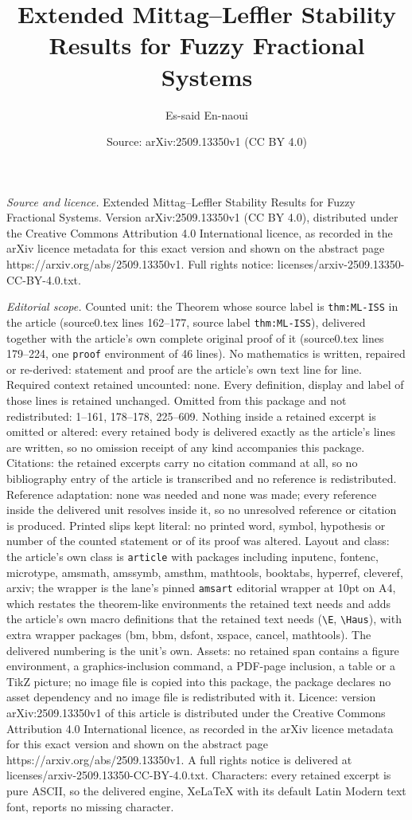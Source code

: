 \documentclass[10pt,a4paper]{amsart}
\title[Extended Mittag--Leffler Stability Results for Fuzzy Fractio]{Extended Mittag--Leffler Stability Results for Fuzzy Fractional Systems}
\author{Es-said En-naoui}
\date{Source: arXiv:2509.13350v1 (CC BY 4.0)}
\begin{document}
\maketitle

\noindent\emph{Source and licence.} Extended Mittag--Leffler Stability Results for Fuzzy Fractional Systems. Version arXiv:2509.13350v1 (CC BY 4.0), distributed under the Creative Commons Attribution 4.0 International licence, as recorded in the arXiv licence metadata for this exact version and shown on the abstract page https://arxiv.org/abs/2509.13350v1. Full rights notice: licenses/arxiv-2509.13350-CC-BY-4.0.txt.\par\smallskip

\noindent\textit{Editorial scope.} Counted unit: the Theorem whose source label is \texttt{thm:ML-ISS} in the article (source0.tex lines 162--177, source label \texttt{thm:ML-ISS}), delivered together with the article's own complete original proof of it (source0.tex lines 179--224, one \texttt{proof} environment of 46 lines). No mathematics is written, repaired or re-derived: statement and proof are the article's own text line for line. Required context retained uncounted: none. Every definition, display and label of those lines is retained unchanged. Omitted from this package and not redistributed: 1--161, 178--178, 225--609. Nothing inside a retained excerpt is omitted or altered: every retained body is delivered exactly as the article's lines are written, so no omission receipt of any kind accompanies this package. Citations: the retained excerpts carry no citation command at all, so no bibliography entry of the article is transcribed and no reference is redistributed. Reference adaptation: none was needed and none was made; every reference inside the delivered unit resolves inside it, so no unresolved reference or citation is produced. Printed slips kept literal: no printed word, symbol, hypothesis or number of the counted statement or of its proof was altered. Layout and class: the article's own class is \texttt{article} with packages including inputenc, fontenc, microtype, amsmath, amssymb, amsthm, mathtools, booktabs, hyperref, cleveref, arxiv; the wrapper is the lane's pinned \texttt{amsart} editorial wrapper at 10pt on A4, which restates the theorem-like environments the retained text needs and adds the article's own macro definitions that the retained text needs (\texttt{\textbackslash E}, \texttt{\textbackslash Haus}), with extra wrapper packages (bm, bbm, dsfont, xspace, cancel, mathtools). The delivered numbering is the unit's own. Assets: no retained span contains a figure environment, a graphics-inclusion command, a PDF-page inclusion, a table or a TikZ picture; no image file is copied into this package, the package declares no asset dependency and no image file is redistributed with it. Licence: version arXiv:2509.13350v1 of this article is distributed under the Creative Commons Attribution 4.0 International licence, as recorded in the arXiv licence metadata for this exact version and shown on the abstract page https://arxiv.org/abs/2509.13350v1. A full rights notice is delivered at licenses/arxiv-2509.13350-CC-BY-4.0.txt. Characters: every retained excerpt is pure ASCII, so the delivered engine, XeLaTeX with its default Latin Modern text font, reports no missing character.
\end{document}
